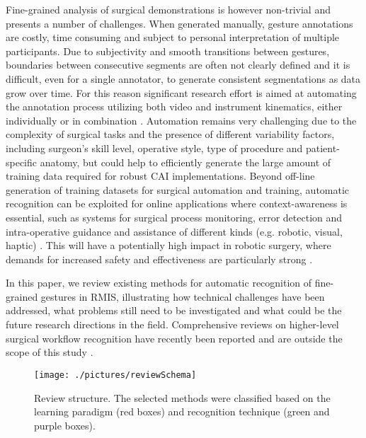 \documentclass[journal]{IEEEtran}
\begin{document}
Fine-grained analysis of surgical demonstrations is however non-trivial and presents a number of challenges. 
When generated manually, gesture annotations are costly, time consuming and subject to personal interpretation of multiple participants. Due to subjectivity and smooth transitions between gestures, boundaries between consecutive segments are often not clearly defined and it is difficult, even for a single annotator, to generate consistent segmentations as data grow over time.
For this reason significant research effort is aimed at automating the annotation process utilizing both video and instrument kinematics, either individually or in combination \cite{Tao2013, Lea2016tcnECCV, dipietro2016}.
Automation remains very challenging due to the complexity of surgical tasks and the presence of different variability factors, including surgeon's skill level, operative style, type of procedure and patient-specific anatomy, but could help to efficiently generate the large amount of training data required for robust CAI implementations.
Beyond off-line generation of training datasets for surgical automation and training, automatic recognition can be exploited for online applications where context-awareness is essential, such as systems for surgical process monitoring, error detection and intra-operative guidance and assistance of different kinds (e.g. robotic, visual, haptic) \cite{Yasar2020, DeRossi2019}. This will have a potentially high impact in robotic surgery, where demands for increased safety and effectiveness are particularly strong \cite{Bell2009}.

In this paper, we review existing methods for automatic recognition of fine-grained gestures in RMIS, illustrating how technical challenges have been addressed, what problems still need to be investigated and what could be the future research directions in the field. 
Comprehensive reviews on higher-level surgical workflow recognition have recently been reported and are outside the scope of this study \cite{Padoy2019, Dergachyova2017, Lalys2014}.

\begin{figure}[t]
	\centering
	\texttt{[image: ./pictures/reviewSchema]}
	\caption[Review structure.]{Review structure. The selected methods were classified based on the learning paradigm (red boxes) and recognition technique (green and purple boxes).}
	\label{fig:reviewSchema}
\end{figure}
\end{document}
